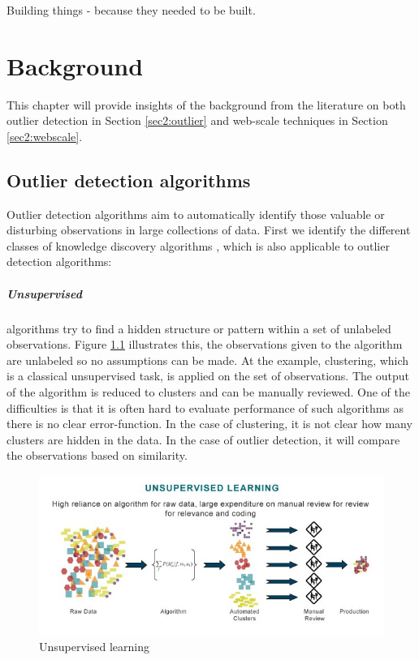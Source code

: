 \begin{savequote}[75mm] 
Building things - because they needed to be built.  
\end{savequote}

\chapter{Background \label{chap2:background}}
This chapter will provide insights of the background from the literature on both outlier detection in Section \ref{sec2:outlier} and web-scale techniques in Section \ref{sec2:webscale}.

\section{Outlier detection algorithms \label{sec2:outlier}}
Outlier detection algorithms aim to automatically identify those valuable or disturbing observations in large collections of data. First we identify the different classes of knowledge discovery algorithms \cite{Fayyad:1996:DMK:257938.257942}, which is also applicable to outlier detection algorithms:

\paragraph{Unsupervised} algorithms try to find a hidden structure or pattern within a set of unlabeled observations. Figure \ref{fig:unsupervised} illustrates this, the observations given to the algorithm are unlabeled so no assumptions can be made. At the example, clustering, which is a classical unsupervised task, is applied on the set of observations. The output of the algorithm is reduced to clusters and can be manually reviewed. One of the difficulties is that it is often hard to evaluate performance of such algorithms as there is no clear error-function. In the case of clustering, it is not clear how many clusters are hidden in the data. In the case of outlier detection, it will compare the observations based on similarity.

\begin{figure}[ht!]
\centering
\includegraphics[width=\textwidth]{figures/unsupervised.jpg}
\caption{Unsupervised learning}
\label{fig:unsupervised}
\end{figure}

